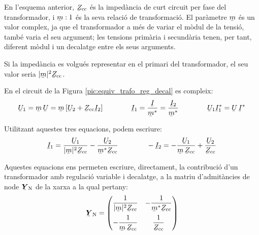 En l'esquema anterior, $\cmplx{Z}\ped{cc}$ \'{e}s la imped\`{a}ncia de curt
circuit per fase del transformador, i $\cmplx{m} : 1$ \'{e}s la seva
relaci\'{o} de transformaci\'{o}. El par\`{a}metre $\cmplx{m}$ \'{e}s un valor
complex, ja que el transformador a m\'{e}s de variar el m\`{o}dul de la
tensi\'{o}, tamb\'{e} varia  el seu argument; les tensions prim\`{a}ria i
secund\`{a}ria tenen, per tant,  diferent m\`{o}dul i un decalatge entre els
seus arguments.

Si la imped\`{a}ncia es volgu\'{e}s representar en el primari del
transformador, el seu valor seria $|\cmplx{m}|^2 \cmplx{Z}\ped{cc}$.

En el circuit de la Figura \vref{pic:equiv_trafo_reg_decal} es
compleix: 
\begin{equation}
   \cmplx{U}_1 = \cmplx{m} \,\cmplx{U} = \cmplx{m}\,
   [\cmplx{U}_2+\cmplx{Z}\ped{cc}\cmplx{I}_2]
   \qquad\qquad
   \cmplx{I}_1 = \frac{\cmplx{I}}{\cmplx{m}^*} = \frac{\cmplx{I}_2}{\cmplx{m}^*}
   \qquad\qquad
   \cmplx{U}_1 \cmplx{I}_1^* = \cmplx{U} \,\cmplx{I}^*
\end{equation}

Utilitzant aquestes tres equacions, podem escriure:
\begin{equation}
   \cmplx{I}_1 = \frac{\cmplx{U}_1}{|\cmplx{m}|^2 \cmplx{Z}\ped{cc}} - \frac{\cmplx{U}_2}
   {\cmplx{m}^* \cmplx{Z}\ped{cc}} \qquad\qquad
   - \cmplx{I}_2 = - \frac{\cmplx{U}_1}{\cmplx{m} \,\cmplx{Z}\ped{cc}} + \frac{\cmplx{U}_2}
   {\cmplx{Z}\ped{cc}}
\end{equation}

Aquestes equacions ens permeten escriure, directament, la
contribuci\'{o} d'un transformador amb regulaci\'{o} variable i decalatge, a
la matriu d'admit\`{a}ncies de node $\mcmplx{Y}\ped{N}$ de la xarxa a la
qual pertany: 
\begin{equation} \label{eq:yn_trafo_reg_decal}
   \mcmplx{Y}\ped{N} = \begin{pmatrix}
     \dfrac{1}{|\cmplx{m}|^2 \cmplx{Z}\ped{cc}} & - \dfrac{1}
   {\cmplx{m}^* \cmplx{Z}\ped{cc}} \\[2.5ex]
     - \dfrac{1}{\cmplx{m} \,\cmplx{Z}\ped{cc}} & \dfrac{1}
   {\cmplx{Z}\ped{cc}}
   \end{pmatrix}
\end{equation}


